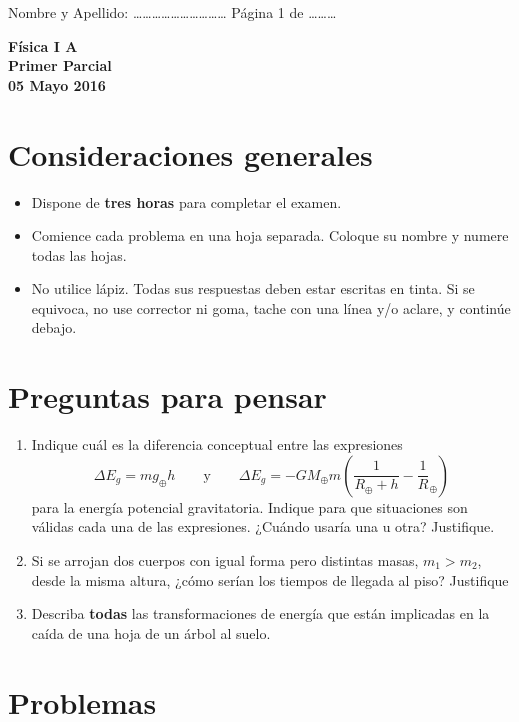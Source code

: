 \documentclass[a4paper,12pt]{article}
\begin{document}
\pagestyle{empty}
Nombre y Apellido: \ldots\ldots\ldots\ldots\ldots\ldots\ldots\ldots\ldots\ldots
Página 1 de \ldots\ldots\ldots \begin{center}
{\Large {\bf{Física I A}}} \\
\bigskip
{\large {\bf{Primer Parcial}}} \\ {\bf{05 Mayo 2016}} \\
\end{center}

\section{Consideraciones generales}

\begin{itemize}
	\item Dispone de {\bf{tres horas}} para completar el examen.
	\item Comience cada problema en una hoja separada. Coloque su nombre y
		numere todas las hojas.  
	\item No utilice lápiz. Todas sus respuestas deben estar escritas en tinta.
		Si se equivoca, no use corrector ni goma, tache con una línea y/o
		aclare, y continúe debajo.
\end{itemize}

\section{Preguntas para pensar}

\begin{enumerate}
	\item Indique cuál es la diferencia conceptual entre las expresiones
		$$\Delta E_g=m g_\oplus h \qquad \mathrm{y} \qquad \Delta E_g = -G
		M_\oplus m \left (\frac{1}{R_\oplus + h} - \frac1R_\oplus \right )$$
		para la energía potencial gravitatoria.  Indique para que situaciones
		son válidas cada una de las expresiones.  ¿Cuándo usaría una u otra?
		Justifique. 
	\item Si se arrojan dos cuerpos con igual forma pero distintas masas,
		$m_1>m_2$, desde la misma altura, ¿cómo serían los tiempos de llegada
		al piso? Justifique
	\item Describa {\bf{todas}} las transformaciones de energía que están
		implicadas en la caída de una hoja de un árbol al suelo.
\end{enumerate}

\section{Problemas}
\end{document}

